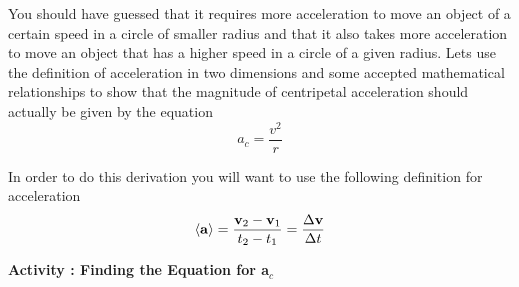 You should have guessed that it requires more acceleration to move an object
of a certain speed in a circle of smaller radius and that it also takes more
acceleration to move an object that has a higher speed in a circle of a given
radius. Lets use the definition of acceleration in two dimensions and some accepted
mathematical relationships to show that the magnitude of centripetal acceleration
should actually be given by the equation
\begin{equation}
a_{c}=\frac{v^{2}}{r}
\end{equation}

In order to do this derivation you will want to use the following definition
for acceleration
\begin{equation}
\left\langle {\bf a}\right\rangle =\frac{{{\bf v}_{2}}-{{\bf v}_{1}}}{t_{2}-t_{1}}=\frac{\Delta {\bf v}}{\Delta t}
\end{equation}

\textbf{Activity : Finding the Equation for a\( _{c} \) }

